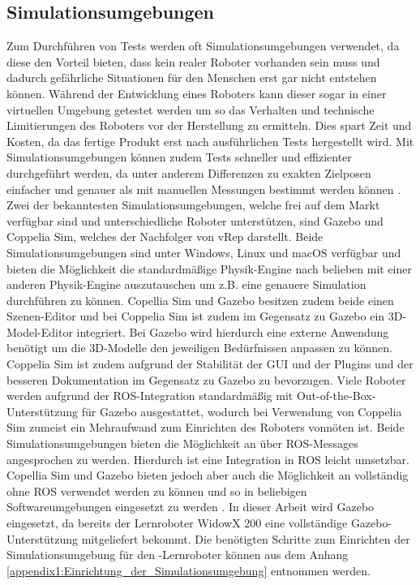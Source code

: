 
\subsection{Simulationsumgebungen}
Zum Durchführen von Tests werden oft Simulationsumgebungen verwendet, da diese den Vorteil bieten, dass kein realer Roboter vorhanden sein muss und dadurch gefährliche Situationen für den Menschen erst gar nicht entstehen können. Während der Entwicklung eines Roboters kann dieser sogar in einer virtuellen Umgebung getestet werden um so das Verhalten und technische Limitierungen des Roboters vor der Herstellung zu ermitteln. Dies spart Zeit und Kosten, da das fertige Produkt erst nach ausführlichen Tests hergestellt wird. Mit Simulationsumgebungen können zudem Tests schneller und effizienter durchgeführt werden, da unter anderem Differenzen zu exakten Zielposen einfacher und genauer als mit manuellen Messungen bestimmt werden können \cite{gazebo_nodate}. Zwei der bekanntesten Simulationsumgebungen, welche frei auf dem Markt verfügbar sind und unterschiedliche Roboter unterstützen, sind Gazebo und Coppelia Sim, welches der Nachfolger von vRep darstellt. Beide Simulationsumgebungen sind unter Windows, Linux und macOS verfügbar und bieten die Möglichkeit die standardmäßige Physik-Engine nach belieben mit einer anderen Physik-Engine auszutauschen um z.B. eine genauere Simulation durchführen zu können. Copellia Sim und Gazebo besitzen zudem beide einen Szenen-Editor und bei Coppelia Sim ist zudem im Gegensatz zu Gazebo ein 3D-Model-Editor integriert. Bei Gazebo wird hierdurch eine externe Anwendung benötigt um die 3D-Modelle den jeweiligen Bedürfnissen anpassen zu können. Coppelia Sim ist zudem aufgrund der Stabilität der GUI und der Plugins und der besseren Dokumentation im Gegensatz zu Gazebo zu bevorzugen. Viele Roboter werden aufgrund der ROS-Integration standardmäßig mit Out-of-the-Box-Unterstützung für Gazebo ausgestattet, wodurch bei Verwendung von Coppelia Sim zumeist ein Mehraufwand zum Einrichten des Roboters vonnöten ist. Beide Simulationsumgebungen bieten die Möglichkeit an über ROS-Messages angesprochen zu werden. Hierdurch ist eine Integration in ROS leicht umsetzbar. Copellia Sim und Gazebo bieten jedoch aber auch die Möglichkeit an vollständig ohne ROS verwendet werden zu können und so in beliebigen Softwareumgebungen eingesetzt zu werden \cite{vrep_vs_gazebo_nodate}. In dieser Arbeit wird Gazebo eingesetzt, da bereits der Lernroboter WidowX 200 eine vollständige Gazebo-Unterstützung mitgeliefert bekommt. Die benötigten Schritte zum Einrichten der Simulationsumgebung für den -Lernroboter können aus dem Anhang \ref{appendix1:Einrichtung_der_Simulationsumgebung} entnommen werden.

